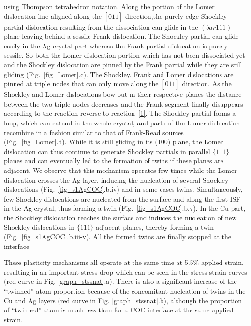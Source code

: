 \documentclass[final,3p,times,twocolumn]{elsarticle}
\begin{document}
using Thompson tetrahedron notation. Along the portion of the Lomer dislocation line aligned along the $\left[01\bar{1}\right]$ direction,the purely edge Shockley partial dislocation resulting from the dissociation can glide in the $\left(bar{1}11\right)$ plane leaving behind a sessile Frank dislocation. The Shockley partial can glide easily in the Ag crystal part whereas the Frank partial dislocation is purely sessile. So both the Lomer dislocation portion which has not been dissociated yet and the Shockley dislocation are pinned by the Frank partial while they are still gliding (Fig.~\ref{fig_Lomer}.c). The Shockley, Frank and Lomer dislocations are pinned at triple nodes that can only move along the $\left[01\bar{1}\right]$ direction. As the Shockley and Lomer dislocations bow out in their respective planes the distance between the two triple nodes decreases and the Frank segment finally disappears according to the reaction reverse to reaction~\ref{1}. The Shockley partial forms a loop, which can extend in the whole crystal, and parts of the Lomer dislocation recombine in a fashion similar to that of Frank-Read sources \citep{frank50} (Fig.~\ref{fig_Lomer}.d). While it is still gliding in its (100) plane, the Lomer dislocation can thus continue to generate Shockley partials in parallel $\lbrace111\rbrace$ planes and can eventually led to the formation of twins if these planes are adjacent. We observe that this mechanism operates few times while the Lomer dislocation crosses the Ag layer, inducing the nucleation of several Shockley dislocations (Fig.~\ref{fig_s1AgCOC}.b.iv) and in some cases twins. Simultaneously, few Shockley dislocations are nucleated from the surface and along the first ISF in the Ag crystal, thus forming a twin (Fig.~\ref{fig_s1AgCOC}.b.v). In the Cu part, the Shockley dislocation reaches the surface and induces the nucleation of new Shockley dislocations in $\lbrace111\rbrace$ adjacent planes, thereby forming a twin (Fig.~\ref{fig_s1AgCOC}.b.iii-v). All the formed twins are finally stopped at the interface.

These plasticity mechanisms all operate at the same time at 5.5\% applied strain, resulting in an important stress drop which can be seen in the stress-strain curves (red curve in Fig. \ref{graph_stssnat}.a). There is also a significant increase of the ``twinned'' atom proportion because of the concomitant nucleation of twins in the Cu and Ag layers (red curve in Fig. \ref{graph_stssnat}.b), although the proportion of ``twinned'' atom is much less than for a COC interface at the same applied strain.
 
\end{document}
